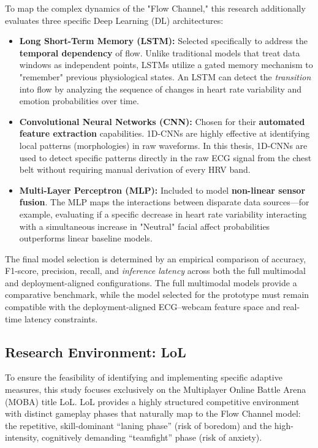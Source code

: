 \begin{itemize}
To map the complex dynamics of the "Flow Channel," this research additionally evaluates three specific Deep Learning (DL) architectures:

\begin{itemize}
    \item \textbf{Long Short-Term Memory (LSTM):} Selected specifically to address the \textbf{temporal dependency} of flow. Unlike traditional models that treat data windows as independent points, LSTMs utilize a gated memory mechanism to "remember" previous physiological states. An LSTM can detect the \textit{transition} into flow by analyzing the sequence of changes in heart rate variability and emotion probabilities over time.
    
    \item \textbf{Convolutional Neural Networks (CNN):} Chosen for their \textbf{automated feature extraction} capabilities. 1D-CNNs are highly effective at identifying local patterns (morphologies) in raw waveforms. In this thesis, 1D-CNNs are used to detect specific patterns directly in the raw ECG signal from the chest belt without requiring manual derivation of every HRV band.
    
    \item \textbf{Multi-Layer Perceptron (MLP):} Included to model \textbf{non-linear sensor fusion}. The MLP maps the interactions between disparate data sources—for example, evaluating if a specific decrease in heart rate variability interacting with a simultaneous increase in "Neutral" facial affect probabilities outperforms linear baseline models.
\end{itemize}

The final model selection is determined by an empirical comparison of accuracy, F1-score, precision, recall, and \textit{inference latency} across both the full multimodal and deployment-aligned configurations. The full multimodal models provide a comparative benchmark, while the model selected for the prototype must remain compatible with the deployment-aligned ECG--webcam feature space and real-time latency constraints.
\end{itemize}

\subsection{Research Environment: LoL}
To ensure the feasibility of identifying and implementing specific adaptive measures, this study focuses exclusively on the Multiplayer Online Battle Arena (MOBA) title LoL. LoL provides a highly structured competitive environment with distinct gameplay phases that naturally map to the Flow Channel model: the repetitive, skill-dominant \enquote{laning phase} (risk of boredom) and the high-intensity, cognitively demanding \enquote{teamfight} phase (risk of anxiety).

